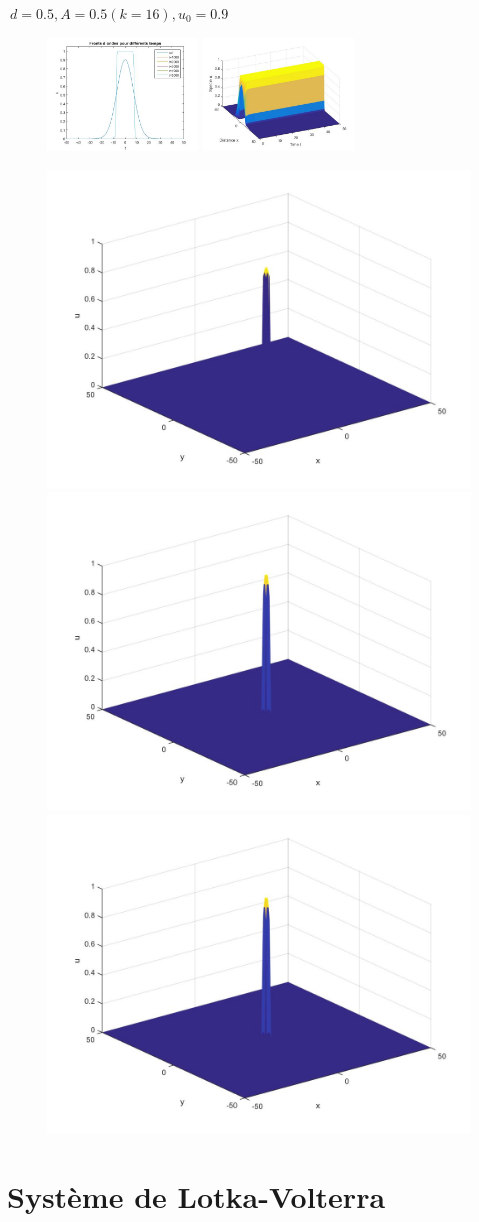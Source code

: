 \documentclass[10pt]{beamer}
\begin{document}
\begin{frame}{$\ d=0.5, A=0.5 (k=16), u_0=0.9$}{}
\begin{figure}[H]
	\centering
	\includegraphics[width=0.40\linewidth, height=3cm]{Allee/F2333}\hfill
	\includegraphics[width=0.55\linewidth, height=3cm]{Allee/F4333}
\end{figure}
\begin{figure}[H]
	\centering
	\includegraphics[width=0.3\linewidth]{Allee/333__1_}\hfill
    \includegraphics[width=0.3\linewidth]{Allee/333__2_}\hfill
	\includegraphics[width=0.3\linewidth]{Allee/333__3_}
\end{figure}
\end{frame}

\section{Système de Lotka-Volterra}
\end{document}
